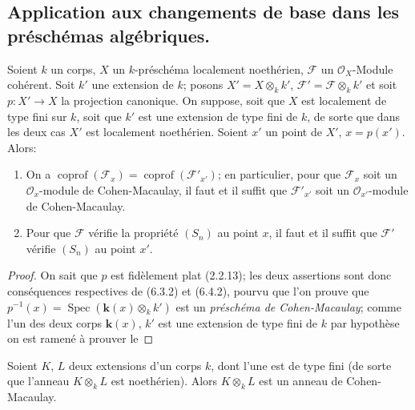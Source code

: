 \subsection{Application aux changements de base dans les préschémas algébriques.}

\begin{proposition}[6.7.1]
\label{IV.2.s6.7.1-fr}
Soient $k$ un corps, $X$ un $k$-préschéma localement noethérien,
$\mathscr F$ un $\mathcal O_X$-Module cohérent. Soit $k'$ une extension
de $k$; posons $X'=X\otimes_k k'$, $\mathscr F'=\mathscr F\otimes_k k'$
et soit $p:X'\to X$ la projection canonique. On suppose, soit que
$X$ est localement de type fini sur $k$, soit que $k'$ est une extension
de type fini de $k$, de sorte que dans les deux cas $X'$ est localement
noethérien. Soient $x'$ un point de $X'$, $x=p(x')$. Alors:
\begin{enumerate}
\item[\textup{(i)}] On a $\operatorname{coprof}(\mathscr F_x)=
\operatorname{coprof}(\mathscr F'_{x'})$; en particulier, pour que
$\mathscr F_x$ soit un $\mathcal O_x$-module de Cohen-Macaulay, il
faut et il suffit que $\mathscr F'_{x'}$ soit un
$\mathcal O_{x'}$-module de Cohen-Macaulay.
\item[\textup{(ii)}] Pour que $\mathscr F$ vérifie la propriété $(S_n)$ au point
$x$, il faut et il suffit que $\mathscr F'$ vérifie $(S_n)$ au point
$x'$.
\end{enumerate}
\end{proposition}


\begin{proof}
On sait que $p$ est fidèlement plat (2.2.13); les deux assertions sont
donc conséquences respectives de (6.3.2) et (6.4.2), pourvu que l'on
prouve que $p^{-1}(x)=\operatorname{Spec}(\boldsymbol{k}(x)\otimes_k k')$ est un
\emph{préschéma de Cohen-Macaulay}; comme l'un des deux corps $\boldsymbol{k}(x)$, $k'$ est
une extension de type fini de $k$ par hypothèse on est ramené à prouver
le
\end{proof}

\begin{lemma}[6.7.1.1]
\label{IV.2.s6.7.1.1-fr}
Soient $K$, $L$ deux extensions d'un corps $k$, dont l'une est de type
fini (de sorte que l'anneau $K\otimes_k L$ est noethérien). Alors
$K\otimes_k L$ est un anneau de Cohen-Macaulay.
\end{lemma}

